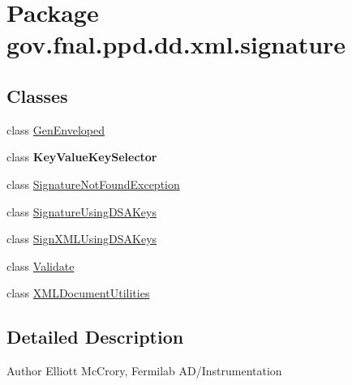 \hypertarget{namespacegov_1_1fnal_1_1ppd_1_1dd_1_1xml_1_1signature}{\section{Package gov.\-fnal.\-ppd.\-dd.\-xml.\-signature}
\label{namespacegov_1_1fnal_1_1ppd_1_1dd_1_1xml_1_1signature}
}
\subsection*{Classes}
\begin{DoxyCompactItemize}
\item 
class \hyperlink{classgov_1_1fnal_1_1ppd_1_1dd_1_1xml_1_1signature_1_1GenEnveloped}{Gen\-Enveloped}
\item 
class {\bfseries Key\-Value\-Key\-Selector}
\item 
class \hyperlink{classgov_1_1fnal_1_1ppd_1_1dd_1_1xml_1_1signature_1_1SignatureNotFoundException}{Signature\-Not\-Found\-Exception}
\item 
class \hyperlink{classgov_1_1fnal_1_1ppd_1_1dd_1_1xml_1_1signature_1_1SignatureUsingDSAKeys}{Signature\-Using\-D\-S\-A\-Keys}
\item 
class \hyperlink{classgov_1_1fnal_1_1ppd_1_1dd_1_1xml_1_1signature_1_1SignXMLUsingDSAKeys}{Sign\-X\-M\-L\-Using\-D\-S\-A\-Keys}
\item 
class \hyperlink{classgov_1_1fnal_1_1ppd_1_1dd_1_1xml_1_1signature_1_1Validate}{Validate}
\item 
class \hyperlink{classgov_1_1fnal_1_1ppd_1_1dd_1_1xml_1_1signature_1_1XMLDocumentUtilities}{X\-M\-L\-Document\-Utilities}
\end{DoxyCompactItemize}


\subsection{Detailed Description}
\begin{DoxyAuthor}{Author}
Elliott Mc\-Crory, Fermilab A\-D/\-Instrumentation 
\end{DoxyAuthor}
